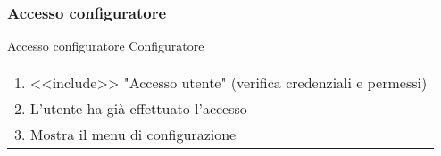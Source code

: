 \begin{minipage}{\textwidth}

\subsubsection{Accesso configuratore}
\usecase
    {Accesso configuratore}
    {
        Configuratore %
    }
    {
        \begin{tabular}{l}
            1. <<include>> "Accesso utente" (verifica credenziali e permessi)\\
            2. L'utente ha già effettuato l'accesso\\
            3. Mostra il menu di configurazione\\
        \end{tabular} \\

    }
    \vspace{0.5cm}


\end{minipage}